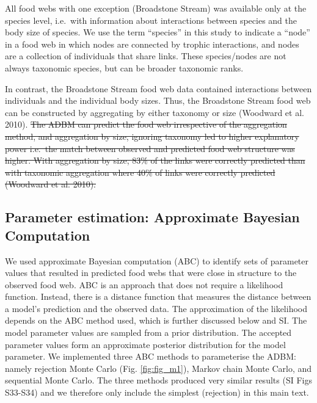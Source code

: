 \documentclass{article}
\providecommand{\DIFdeltex}[1]{{\protect\color{red}\sout{#1}}}                      %
\providecommand{\DIFdelbegin}{} %
\providecommand{\DIFdelend}{} %
\providecommand{\DIFdel}[1]{\texorpdfstring{\DIFdeltex{#1}}{}} %
\newcommand{\DIFscaledelfig}{0.5}
\newlength{\DIFdelgraphicswidth} %
\newlength{\DIFdelgraphicsheight} %
\newcommand{\DIFdelincludegraphics}[2][]{%
\sbox{\DIFdelgraphicsbox}{\DIFOincludegraphics[#1]{#2}}%
\settoboxwidth{\DIFdelgraphicswidth}{\DIFdelgraphicsbox} %
\settoboxtotalheight{\DIFdelgraphicsheight}{\DIFdelgraphicsbox} %
\scalebox{\DIFscaledelfig}{%
\parbox[b]{\DIFdelgraphicswidth}{\usebox{\DIFdelgraphicsbox}\\[-\baselineskip] \rule{\DIFdelgraphicswidth}{0em}}\llap{\resizebox{\DIFdelgraphicswidth}{\DIFdelgraphicsheight}{%
\setlength{\unitlength}{\DIFdelgraphicswidth}%
\begin{picture}(1,1)%
\thicklines\linethickness{2pt} %
{\color[rgb]{1,0,0}\put(0,0){\framebox(1,1){}}}%
{\color[rgb]{1,0,0}\put(0,0){\line( 1,1){1}}}%
{\color[rgb]{1,0,0}\put(0,1){\line(1,-1){1}}}%
\end{picture}%
}\hspace*{3pt}}} %
} %
\DeclareRobustCommand{\DIFdelbegin}{\DIFOdelbegin \let\includegraphics\DIFdelincludegraphics} %
\DeclareRobustCommand{\DIFdelend}{\DIFOaddend \let\includegraphics\DIFOincludegraphics} %
\begin{document}
All food webs with one exception (Broadstone Stream) was available only
at the species level, i.e.~with information about interactions between
species and the body size of species. We use the term ``species'' in
this study to indicate a ``node'' in a food web in which nodes are
connected by trophic interactions, and nodes are a collection of
individuals that share links. These species/nodes are not always
taxonomic species, but can be broader taxonomic ranks.

In contrast, the Broadstone Stream food web data contained interactions
between individuals and the individual body sizes. Thus, the Broadstone
Stream food web can be constructed by aggregating by either taxonomy or
size (Woodward et al. 2010).
\DIFdelbegin \DIFdel{The ADBM can predict the food web
irrespective of the aggregation method, and aggregation by size,
ignoring taxonomy led to higher explanatory power i.e.~the match between
observed and predicted food web structure was higher. With aggregation
by size, 83\% of the links were correctly predicted than with taxonomic
aggregation where 40\% of links were correctly predicted (Woodward et
al. 2010).
}\DIFdelend 

\hypertarget{parameter-estimation-approximate-bayesian-computation}{%
\subsection{Parameter estimation: Approximate Bayesian
Computation}\label{parameter-estimation-approximate-bayesian-computation}}

We used approximate Bayesian computation (ABC) to identify sets of
parameter values that resulted in predicted food webs that were close in
structure to the observed food web. ABC is an approach that does not
require a likelihood function. Instead, there is a distance function
that measures the distance between a model's prediction and the observed
data. The approximation of the likelihood depends on the ABC method
used, which is further discussed below and SI. The model parameter
values are sampled from a prior distribution. The accepted parameter
values form an approximate posterior distribution for the model
parameter. We implemented three ABC methods to parameterise the ADBM:
namely rejection Monte Carlo (Fig. \ref{fig:fig_m1}), Markov chain Monte
Carlo, and sequential Monte Carlo. The three methods produced very
similar results (SI Figs S33-S34) and we therefore only include the
simplest (rejection) in this main text.
\end{document}
